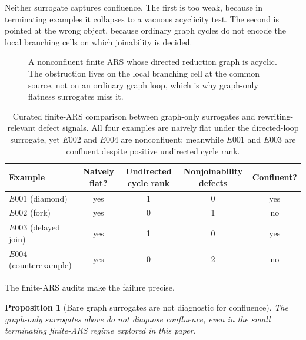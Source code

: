 \documentclass[11pt]{article}
\numberwithin{equation}{section}
\newtheorem{proposition}[theorem]{Proposition}
\theoremstyle{definition}
\theoremstyle{remark}
\begin{document}
Neither surrogate captures confluence. The first is too weak, because in terminating examples it collapses to a vacuous acyclicity test. The second is pointed at the wrong object, because ordinary graph cycles do not encode the local branching cells on which joinability is decided.

\begin{figure}[t]
    \centering
    \caption{A nonconfluent finite ARS whose directed reduction graph is acyclic. The obstruction lives on the local branching cell at the common source, not on an ordinary graph loop, which is why graph-only flatness surrogates miss it.}
    \label{fig:bare-graph-failure}
\end{figure}

\begin{table}[t]
    \caption{Curated finite-ARS comparison between graph-only surrogates and rewriting-relevant defect signals. All four examples are naively flat under the directed-loop surrogate, yet $E002$ and $E004$ are nonconfluent; meanwhile $E001$ and $E003$ are confluent despite positive undirected cycle rank.}
    \label{tab:bare-graph-flatness-mismatch}
    \centering
    \smallskip
    \small
\begin{tabular}{@{}lcccc@{}}
\toprule
Example & Naively flat? & Undirected cycle rank & Nonjoinability defects & Confluent? \\
\midrule
$E001$ (diamond)           & yes & 1 & 0 & yes \\
$E002$ (fork)              & yes & 0 & 1 & no \\
$E003$ (delayed join)      & yes & 1 & 0 & yes \\
$E004$ (counterexample)    & yes & 0 & 2 & no \\
\bottomrule
\end{tabular}
 \end{table}

The finite-ARS audits make the failure precise.

\begin{proposition}[Bare graph surrogates are not diagnostic for confluence]
\label{prop:bare-graph-not-diagnostic}
The graph-only surrogates above do not diagnose confluence, even in the small terminating finite-ARS regime explored in this paper.
\end{proposition}
\end{document}
